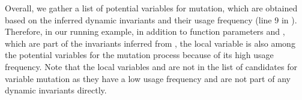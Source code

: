 Overall, we gather a list of potential variables for mutation, which are obtained based on the inferred dynamic invariants  and their usage frequency (line 9 in ). Therefore, in our running example, in addition to function parameters  and , which are part of the invariants inferred from , the local variable  is also among the potential variables for the mutation process because of its high usage frequency. Note that the local variables  and  are not  in the list of candidates for variable mutation as they have a low usage frequency and are not part of any dynamic invariants directly.